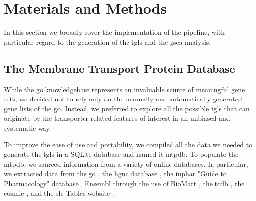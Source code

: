 \section{Materials and Methods}

In this section we broadly cover the implementation of the pipeline, with
particular regard to the generation of the \glspl{tgl} and the \gls{gsea}
analysis.

\subsection{The Membrane Transport Protein Database}
While the \gls{go} knowledgebase \cite{ashburnerGeneOntologyTool2000,
thegeneontologyconsortiumGeneOntologyKnowledgebase2023} represents an invaluable
source of meaningful gene sets, we decided not to rely only on the manually and
automatically generated gene lists of the \gls{go}. Instead, we preferred to
explore all the possible \glspl{tgl} that can originate by the
transporter-related features of interest in an unbiased and systematic way.

To improve the ease of use and portability, we compiled all the data we needed
to generate the \glspl{tgl} in a SQLite database and named it \gls{mtpdb}. To
populate the \gls{mtpdb}, we sourced information from a variety of online
databases. In particular, we extracted data from the \gls{go}
\cite{ashburnerGeneOntologyTool2000,
thegeneontologyconsortiumGeneOntologyKnowledgebase2023}, the \gls{hgnc} database
\cite{sealGenenamesOrgHGNC2023}, the \gls{iuphar} "Guide to Pharmacology"
database \cite{hardingIUPHARBPSGuide2022}, Ensembl
\cite{cunninghamEnsembl20222022} through the use of BioMart
\cite{smedleyBioMartBiologicalQueries2009}, the \gls{tcdb}
\cite{saierTransporterClassificationDatabase2021}, the \gls{cosmic}
\cite{tateCOSMICCatalogueSomatic2019}, and the \gls{slc} Tables website
\cite{hedigerABCsMembraneTransporters2013}.

